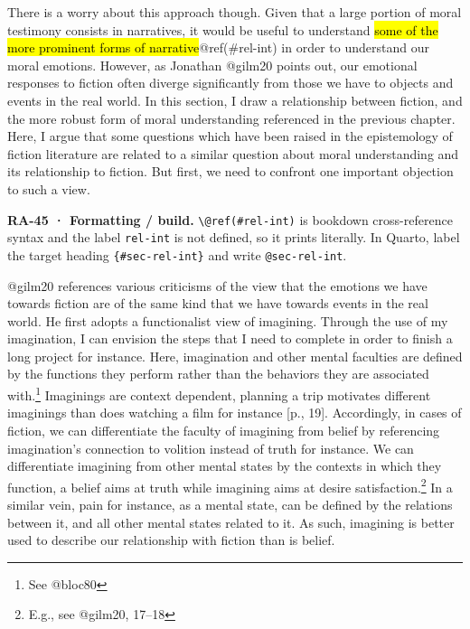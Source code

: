 \documentclass[
  letterpaper,
  DIV=11,
  numbers=noendperiod]{scrartcl}
\theoremstyle{remark}
\begin{document}
There is a worry about this approach though. Given that a large portion
of moral testimony consists in narratives, it would be useful to
understand \hl{some of the more prominent forms of
narrative}@ref(\#rel-int) in order to understand our moral emotions.
However, as Jonathan @gilm20 points out, our emotional responses to
fiction often diverge significantly from those we have to objects and
events in the real world. In this section, I draw a relationship between
fiction, and the more robust form of moral understanding referenced in
the previous chapter. Here, I argue that some questions which have been
raised in the epistemology of fiction literature are related to a
similar question about moral understanding and its relationship to
fiction. But first, we need to confront one important objection to such
a view.

\begin{tcolorbox}[enhanced jigsaw, arc=.35mm, bottomrule=.15mm, bottomtitle=1mm, breakable, colback=white, colbacktitle=quarto-callout-note-color!10!white, colframe=quarto-callout-note-color-frame, coltitle=black, left=2mm, leftrule=.75mm, opacityback=0, opacitybacktitle=0.6, rightrule=.15mm, title=\textcolor{quarto-callout-note-color}{\faInfo}\hspace{0.5em}{Note}, titlerule=0mm, toprule=.15mm, toptitle=1mm]

\textbf{RA-45 · Formatting / build.}
\texttt{\textbackslash{}@ref(\#rel-int)} is bookdown cross-reference
syntax and the label \texttt{rel-int} is not defined, so it prints
literally. In Quarto, label the target heading
\texttt{\{\#sec-rel-int\}} and write \texttt{@sec-rel-int}.

\end{tcolorbox}

@gilm20 references various criticisms of the view that the emotions we
have towards fiction are of the same kind that we have towards events in
the real world. He first adopts a functionalist view of imagining.
Through the use of my imagination, I can envision the steps that I need
to complete in order to finish a long project for instance. Here,
imagination and other mental faculties are defined by the functions they
perform rather than the behaviors they are associated with.\footnote{See
  @bloc80} Imaginings are context dependent, planning a trip motivates
different imaginings than does watching a film for instance {[}p.,
19{]}. Accordingly, in cases of fiction, we can differentiate the
faculty of imagining from belief by referencing imagination's connection
to volition instead of truth for instance. We can differentiate
imagining from other mental states by the contexts in which they
function, a belief aims at truth while imagining aims at desire
satisfaction.\footnote{E.g., see @gilm20, 17--18} In a similar vein,
pain for instance, as a mental state, can be defined by the relations
between it, and all other mental states related to it. As such,
imagining is better used to describe our relationship with fiction than
is belief.
\end{document}
